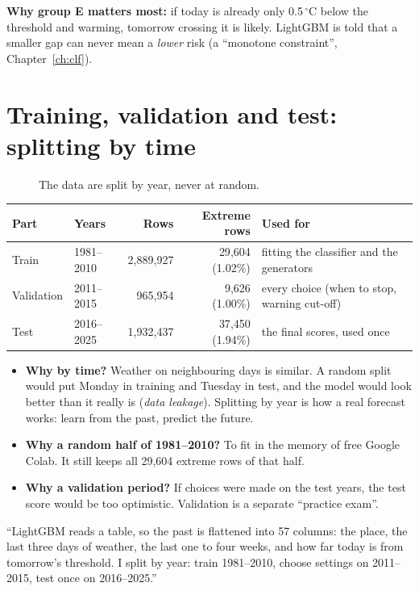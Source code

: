 \textbf{Why group E matters most:} if today is already only 0.5\,$^\circ$C below the threshold and warming, tomorrow
crossing it is likely. LightGBM is told that a smaller gap can never mean a \emph{lower} risk (a ``monotone
constraint'', Chapter~\ref{ch:clf}).

\section{Training, validation and test: splitting by time}
\begin{figure}[H]
\centering
{}
\caption{The data are split by year, never at random.}
\end{figure}

\begin{center}
\footnotesize
\begin{tabular}{llrrl}
\toprule
\textbf{Part} & \textbf{Years} & \textbf{Rows} & \textbf{Extreme rows} & \textbf{Used for}\\
\midrule
Train & 1981--2010 & 2{,}889{,}927 & 29{,}604 (1.02\%) & fitting the classifier and the generators\\
Validation & 2011--2015 & 965{,}954 & 9{,}626 (1.00\%) & every choice (when to stop, warning cut-off)\\
Test & 2016--2025 & 1{,}932{,}437 & 37{,}450 (1.94\%) & the final scores, used once\\
\bottomrule
\end{tabular}
\end{center}

\begin{itemize}
  \item \textbf{Why by time?} Weather on neighbouring days is similar. A random split would put Monday in training
        and Tuesday in test, and the model would look better than it really is (\emph{data leakage}). Splitting by
        year is how a real forecast works: learn from the past, predict the future.
  \item \textbf{Why a random half of 1981--2010?} To fit in the memory of free Google Colab. It still keeps all 29{,}604
        extreme rows of that half.
  \item \textbf{Why a validation period?} If choices were made on the test years, the test score would be too
        optimistic. Validation is a separate ``practice exam''.
\end{itemize}

\begin{sayit}
``LightGBM reads a table, so the past is flattened into 57 columns: the place, the last three days of weather, the last
one to four weeks, and how far today is from tomorrow's threshold. I split by year: train 1981--2010, choose settings
on 2011--2015, test once on 2016--2025.''
\end{sayit}
